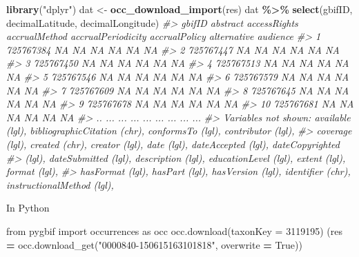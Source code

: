 \documentclass[3p]{elsarticle} %
\newenvironment{Shaded}{\begin{snugshade}}{\end{snugshade}}
\newcommand{\CommentTok}[1]{\textcolor[rgb]{0.56,0.35,0.01}{\textit{#1}}}
\newcommand{\ImportTok}[1]{#1}
\newcommand{\KeywordTok}[1]{\textcolor[rgb]{0.13,0.29,0.53}{\textbf{#1}}}
\newcommand{\NormalTok}[1]{#1}
\newcommand{\OperatorTok}[1]{\textcolor[rgb]{0.81,0.36,0.00}{\textbf{#1}}}
\newcommand{\StringTok}[1]{\textcolor[rgb]{0.31,0.60,0.02}{#1}}
\newcommand{\VariableTok}[1]{\textcolor[rgb]{0.00,0.00,0.00}{#1}}
\begin{document}
\begin{Shaded}
\begin{Highlighting}[]
\KeywordTok{library}\NormalTok{(}\StringTok{"dplyr"}\NormalTok{)}
\NormalTok{dat <{-}}\StringTok{ }\KeywordTok{occ\_download\_import}\NormalTok{(res)}
\NormalTok{dat }\OperatorTok{\%>\%}
\StringTok{  }\KeywordTok{select}\NormalTok{(gbifID, decimalLatitude, decimalLongitude)}
\CommentTok{\#>       gbifID abstract accessRights accrualMethod accrualPeriodicity accrualPolicy alternative audience}
\CommentTok{\#> 1  725767384       NA                         NA                 NA            NA          NA       NA}
\CommentTok{\#> 2  725767447       NA                         NA                 NA            NA          NA       NA}
\CommentTok{\#> 3  725767450       NA                         NA                 NA            NA          NA       NA}
\CommentTok{\#> 4  725767513       NA                         NA                 NA            NA          NA       NA}
\CommentTok{\#> 5  725767546       NA                         NA                 NA            NA          NA       NA}
\CommentTok{\#> 6  725767579       NA                         NA                 NA            NA          NA       NA}
\CommentTok{\#> 7  725767609       NA                         NA                 NA            NA          NA       NA}
\CommentTok{\#> 8  725767645       NA                         NA                 NA            NA          NA       NA}
\CommentTok{\#> 9  725767678       NA                         NA                 NA            NA          NA       NA}
\CommentTok{\#> 10 725767681       NA                         NA                 NA            NA          NA       NA}
\CommentTok{\#> ..       ...      ...          ...           ...                ...           ...         ...      ...}
\CommentTok{\#> Variables not shown: available (lgl), bibliographicCitation (chr), conformsTo (lgl), contributor (lgl),}
\CommentTok{\#>      coverage (lgl), created (chr), creator (lgl), date (lgl), dateAccepted (lgl), dateCopyrighted}
\CommentTok{\#>      (lgl), dateSubmitted (lgl), description (lgl), educationLevel (lgl), extent (lgl), format (lgl),}
\CommentTok{\#>      hasFormat (lgl), hasPart (lgl), hasVersion (lgl), identifier (chr), instructionalMethod (lgl),}
\end{Highlighting}
\end{Shaded}

In Python

\begin{Shaded}
\begin{Highlighting}[]
\ImportTok{from}\NormalTok{ pygbif }\ImportTok{import}\NormalTok{ occurrences }\ImportTok{as}\NormalTok{ occ}
\NormalTok{occ.download(}\StringTok{\textquotesingle{}taxonKey = 3119195\textquotesingle{}}\NormalTok{)}
\NormalTok{(res }\OperatorTok{=}\NormalTok{ occ.download\_get(}\StringTok{"0000840{-}150615163101818"}\NormalTok{, overwrite }\OperatorTok{=} \VariableTok{True}\NormalTok{))}
\end{Highlighting}
\end{Shaded}
\end{document}
